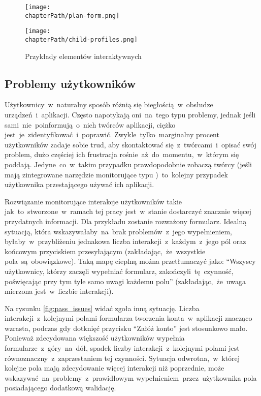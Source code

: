 \bigskip
\begin{figure}[H]
\centering
\begin{minipage}{.35\textwidth}
	\centering
	\texttt{[image: \\chapterPath/plan-form.png]}
\end{minipage}
\begin{minipage}{.45\textwidth}
	\centering
	\texttt{[image: \\chapterPath/child-profiles.png]}
\end{minipage}
\bigskip
\caption{Przykłady elementów interaktywnych}
\label{fig:interactive_areas}
\end{figure}

\subsection{Problemy użytkowników}
Użytkownicy~w~naturalny sposób różnią się biegłością~w~obsłudze urządzeń~i~aplikacji. Często napotykają oni~na~tego typu problemy, jednak jeśli sami~nie~poinformują~o~nich twórców aplikacji, ciężko jest~je~zidentyfikować~i~poprawić. Zwykle~tylko~marginalny procent użytkowników zadaje sobie trud, aby skontaktować się~z~twórcami~i~opisać swój problem, dużo częściej ich frustracja rośnie~aż~do~momentu,~w~którym się poddają. Jedyne~co~w~takim przypadku prawdopodobnie zobaczą twórcy (jeśli mają zintegrowane narzędzie monitorujące typu )~to~kolejny przypadek użytkownika przestającego używać ich aplikacji. 

Rozwiązanie monitorujące interakcje użytkowników takie jak~to~stworzone~w~ramach tej pracy jest~w~stanie dostarczyć znacznie więcej przydatnych informacji. Dla przykładu zostanie rozważony formularz. Idealną sytuacją, która wskazywałaby~na~brak problemów~z~jego wypełnieniem, byłaby~w~przybliżeniu jednakowa liczba interakcji~z~każdym~z~jego pól oraz końcowym przyciskiem przesyłającym (zakładając,~że~wszystkie pola~są~obowiązkowe). Taką mapę cieplną można przetłumaczyć jako: ``Wszyscy użytkownicy, którzy zaczęli wypełniać formularz, zakończyli~tę~czynność, poświęcając przy tym tyle samo uwagi każdemu polu'' (zakładając,~że~uwaga mierzona jest~w~liczbie interakcji). 

Na rysunku \ref{fig:pass_issues} widać zgoła inną sytuację. Liczba interakcji~z~kolejnymi polami formularza tworzenia konta~w~aplikacji znacząco wzrasta, podczas gdy dotknięć przycisku ``Załóż konto'' jest stosunkowo mało. Ponieważ zdecydowana większość użytkowników wypełnia formularze~z~góry~na~dół, spadek liczby interakcji~z~kolejnymi polami jest równoznaczny~z~zaprzestaniem tej czynności. Sytuacja odwrotna,~w~której kolejne pola mają zdecydowanie więcej interakcji niż poprzednie, może wskazywać~na~problemy~z~prawidłowym wypełnieniem~przez~użytkownika pola posiadającego dodatkową walidację. 

